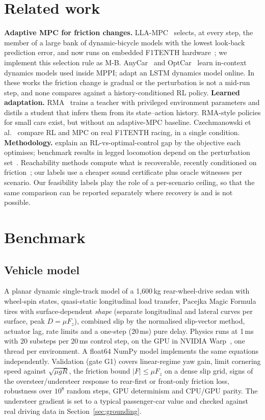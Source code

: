 \documentclass[11pt]{article}
\begin{document}
\section{Related work}
\textbf{Adaptive MPC for friction changes.} LLA-MPC~\citep{llampc} selects, at every step, the member of a large
bank of dynamic-bicycle models with the lowest look-back prediction error, and now runs on embedded F1TENTH
hardware~\citep{llampchw}; we implement this selection rule as M-B.
AnyCar~\citep{anycar} and OptCar~\citep{optcar} learn in-context dynamics models used inside MPPI;
\citet{kalaria} adapt an LSTM dynamics model online. In these works the friction change is gradual or the
perturbation is not a mid-run step, and none compares against a history-conditioned RL policy.
\textbf{Learned adaptation.} RMA~\citep{rma} trains a teacher with privileged environment parameters and distils a
student that infers them from its state--action history. RMA-style policies for small cars exist, but without an
adaptive-MPC baseline. Czechmanowski et al.~\citep{czech} compare RL and MPC on real F1TENTH racing, in a single
condition. \textbf{Methodology.} \citet{song} explain an RL-vs-optimal-control gap by the objective each optimises;
benchmark results in legged locomotion depend on the perturbation set~\citep{leggedbench}. Reachability methods compute what is recoverable, recently conditioned on friction~\citep{cchj}; our labels use a
cheaper sound certificate plus oracle witnesses per scenario. Our feasibility labels
play the role of a per-scenario ceiling, so that the same comparison can be reported separately where recovery is
and is not possible.

\section{Benchmark}\label{sec:bench}
\subsection{Vehicle model}
A planar dynamic single-track model of a 1,600\,kg rear-wheel-drive sedan with wheel-spin states, quasi-static
longitudinal load transfer, Pacejka Magic Formula tires with surface-dependent \emph{shape} (separate longitudinal
and lateral curves per surface, peak $D=\mu F_z$), combined slip by the normalised slip-vector method, actuator lag,
rate limits and a one-step (20\,ms) pure delay. Physics runs at 1\,ms with 20 substeps per 20\,ms control step, on
the GPU in NVIDIA Warp~\citep{warp}, one thread per environment. A float64 NumPy model implements the same
equations independently. Validation (gate G1) covers linear-regime yaw gain, limit cornering speed against
$\sqrt{\mu g R}$, the friction bound $|F|\le\mu F_z$ on a dense slip grid, signs of the oversteer/understeer response
to rear-first or front-only friction loss, robustness over $10^8$ random steps, GPU determinism and CPU/GPU parity.
The understeer gradient is set to a typical passenger-car value and checked against real driving data in
Section~\ref{sec:grounding}.
\end{document}
